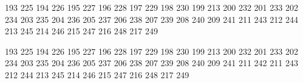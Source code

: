 
\startmapping[iso-8859-7]


 193 225 %
 194 226 %
 195 227 %
 196 228 %
 197 229 %
 198 230 %
 199 213 %
 200 232 %
 201 233 %
 202 234 %
 203 235 %
 204 236 %
 205 237 %
 206 238 %
 207 239 %
 208 240 %
 209 241 %
 211 243 %
 212 244 %
 213 245 %
 214 246 %
 215 247 %
 216 248 %
 217 249 %


 193 225 %
 194 226 %
 195 227 %
 196 228 %
 197 229 %
 198 230 %
 199 213 %
 200 232 %
 201 233 %
 202 234 %
 203 235 %
 204 236 %
 205 237 %
 206 238 %
 207 239 %
 208 240 %
 209 241 %
 211 242 %
 211 243 %
 212 244 %
 213 245 %
 214 246 %
 215 247 %
 216 248 %
 217 249 %

